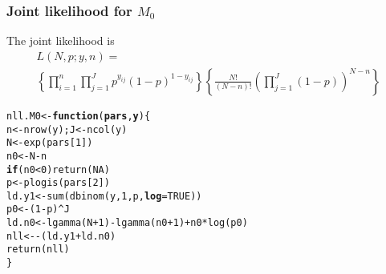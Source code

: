 \documentclass[color=usenames,dvipsnames]{beamer}\usepackage[]{graphicx}\usepackage[]{color}
\makeatletter
\newcommand{\hlnum}[1]{\textcolor[rgb]{0.69,0.494,0}{#1}}%
\newcommand{\hlopt}[1]{\textcolor[rgb]{0,0,0}{#1}}%
\newcommand{\hlstd}[1]{\textcolor[rgb]{0,0,0}{#1}}%
\newcommand{\hlkwa}[1]{\textcolor[rgb]{0,0,0}{\textbf{#1}}}%
\newcommand{\hlkwb}[1]{\textcolor[rgb]{0,0.341,0.682}{#1}}%
\newcommand{\hlkwc}[1]{\textcolor[rgb]{0,0,0}{\textbf{#1}}}%
\newcommand{\hlkwd}[1]{\textcolor[rgb]{0.004,0.004,0.506}{#1}}%
\newenvironment{kframe}{%
 \def\at@end@of@kframe{}%
 \ifinner\ifhmode%
  \def\at@end@of@kframe{\end{minipage}}%
  \begin{minipage}{\columnwidth}%
 \fi\fi%
 \def\FrameCommand##1{\hskip\@totalleftmargin \hskip-\fboxsep
 \colorbox{shadecolor}{##1}\hskip-\fboxsep
     \hskip-\linewidth \hskip-\@totalleftmargin \hskip\columnwidth}%
 \MakeFramed {\advance\hsize-\width
   \@totalleftmargin\z@ \linewidth\hsize
   \@setminipage}}%
 {\par\unskip\endMakeFramed%
 \at@end@of@kframe}
\newenvironment{knitrout}{}{} %
\makeatother
\begin{document}
\begin{frame}[fragile]
  \frametitle{Joint likelihood for $M_0$}
  The joint likelihood is
  \begin{multline*}
    L(N,p; y,n) = \\
    \left\{\prod_{i=1}^n \prod_{j=1}^J p^{y_{ij}}(1-p)^{1-y_{ij}}\right\}
    \left\{\frac{N!}{(N-n)!}  \left(\prod_{j=1}^J(1-p)\right)^{N-n} \right\}
  \end{multline*}
  \pause
  \vfill
\begin{knitrout}\scriptsize
{}\color{fgcolor}\begin{kframe}
\begin{alltt}
\hlstd{nll.M0} \hlkwb{<-} \hlkwa{function}\hlstd{(}\hlkwc{pars}\hlstd{,} \hlkwc{y}\hlstd{) \{}
    \hlstd{n} \hlkwb{<-} \hlkwd{nrow}\hlstd{(y);       J} \hlkwb{<-} \hlkwd{ncol}\hlstd{(y)}
    \hlstd{N} \hlkwb{<-} \hlkwd{exp}\hlstd{(pars[}\hlnum{1}\hlstd{])}
    \hlstd{n0} \hlkwb{<-} \hlstd{N}\hlopt{-}\hlstd{n}
    \hlkwa{if}\hlstd{(n0}\hlopt{<}\hlnum{0}\hlstd{)} \hlkwd{return}\hlstd{(}\hlnum{NA}\hlstd{)}
    \hlstd{p} \hlkwb{<-} \hlkwd{plogis}\hlstd{(pars[}\hlnum{2}\hlstd{])}
    \hlstd{ld.y1} \hlkwb{<-} \hlkwd{sum}\hlstd{(}\hlkwd{dbinom}\hlstd{(y,} \hlnum{1}\hlstd{, p,} \hlkwc{log}\hlstd{=}\hlnum{TRUE}\hlstd{))}
    \hlstd{p0} \hlkwb{<-} \hlstd{(}\hlnum{1}\hlopt{-}\hlstd{p)}\hlopt{^}\hlstd{J}
    \hlstd{ld.n0} \hlkwb{<-} \hlkwd{lgamma}\hlstd{(N}\hlopt{+}\hlnum{1}\hlstd{)}\hlopt{-}\hlkwd{lgamma}\hlstd{(n0}\hlopt{+}\hlnum{1}\hlstd{)}\hlopt{+}\hlstd{n0}\hlopt{*}\hlkwd{log}\hlstd{(p0)}
    \hlstd{nll} \hlkwb{<-} \hlopt{-}\hlstd{(ld.y1}\hlopt{+}\hlstd{ld.n0)}
    \hlkwd{return}\hlstd{(nll)}
\hlstd{\}}
\end{alltt}
\end{kframe}
\end{knitrout}
\end{frame}
\end{document}
